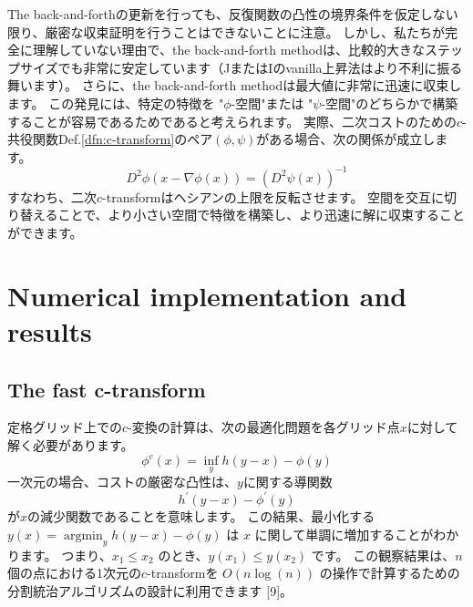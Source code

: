 \documentclass{jsarticle}
\theoremstyle{definition}
\begin{document}
\begin{comment}
  Proposition 2の簡単な証明を以下に示します。

  1. 全ての反復$\varphi_n$、$\varphi_{n+1/2}$、$\psi_n$、$\psi_{n+1/2}$が関数集合$S_{\lambda}=\{\varphi:(1-\lambda^{-1})I\leq D^2\varphi(x)\leq(1-\lambda)I\}$に属すると仮定します。
  2. 反復の定義を使用して、$\varphi_{n+1}$と$\psi_{n+1}$を$\varphi_n$、$\varphi_{n+1/2}$、$\psi_n$、$\psi_{n+1/2}$の式で表します。
  3. 関数集合$S_{\lambda}$に関する仮定を使用して、$\varphi_{n+1}$と$\varphi_{n+1/2}$の差、および$\psi_{n+1}$と$\psi_{n+1/2}$の差を境界します。
  4. 差の境界と二次コスト関数の性質を使用して、不等式$D(\varphi_{n+1},\psi_{n+1})\geq D(\varphi_{n+1/2},\psi_{n+1/2})\geq D(\varphi_n,\psi_n)$を導出します。
  5. 原始問題と双対問題の双方の関係性と二次コスト関数の性質を使用して、不等式$I(\psi_{n+1})\geq I(\psi_{n+1/2})\geq J(\varphi_{n+1/2})\geq J(\varphi_n)\geq I(\psi_n)$を導出します。

  注意：これは一般的な概要であり、実際の証明には追加の手順と技術的な詳細が必要な場合があります。
\end{comment}

\vspace\baselineskip 

The back-and-forthの更新を行っても、反復関数の凸性の境界条件を仮定しない限り、厳密な収束証明を行うことはできないことに注意。
しかし、私たちが完全に理解していない理由で、the back-and-forth methodは、比較的大きなステップサイズでも非常に安定しています（JまたはIのvanilla上昇法はより不利に振る舞います）。
さらに、the back-and-forth methodは最大値に非常に迅速に収束します。
この発見には、特定の特徴を "$\phi$-空間"または "$\psi$-空間"のどちらかで構築することが容易であるためであると考えられます。
実際、二次コストのための$c$-共役関数Def.\ref{dfn:c-transform}のペア$(\phi, \psi)$がある場合、次の関係が成立します。
$$
D^2 \phi(x - \nabla\phi(x)) = (D^2 \psi(x))^{-1}
$$
すなわち、二次$c$-transformはヘシアンの上限を反転させます。
空間を交互に切り替えることで、より小さい空間で特徴を構築し、より迅速に解に収束することができます。


\section{Numerical implementation and results}
\subsection{The fast c-transform}


定格グリッド上での$c$-変換の計算は、次の最適化問題を各グリッド点$x$に対して解く必要があります。
$$
\phi^c(x) = \inf_y h(y - x) - \phi(y)
$$
一次元の場合、コストの厳密な凸性は、$y$に関する導関数
$$
h^\prime(y - x) - \phi^\prime(y)
$$
が$x$の減少関数であることを意味します。
この結果、最小化する $y(x)=\operatorname{argmin}_y h(y-x) - \phi(y)$ は $x$ に関して単調に増加することがわかります。
つまり、$x_1 \leq x_2$ のとき、$y(x_1) \leq y(x_2)$ です。
この観察結果は、$n$個の点における1次元の$c$-transformを $O(n \log(n))$ の操作で計算するための分割統治アルゴリズムの設計に利用できます [9]。
\end{document}
